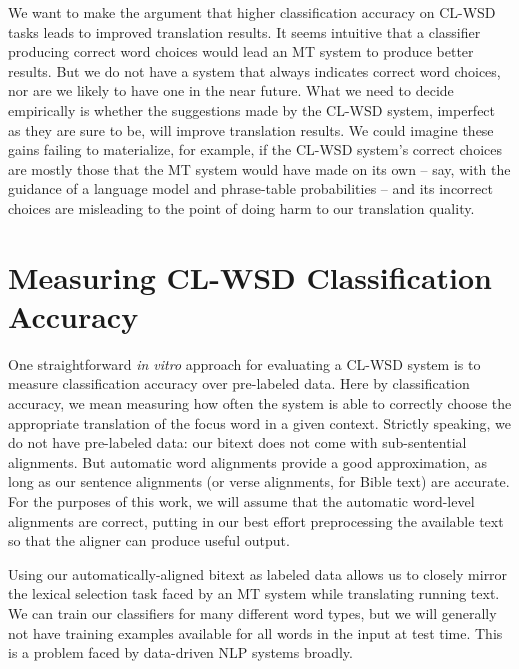 
We want to make the argument that higher classification accuracy on CL-WSD
tasks leads to improved translation results. It seems intuitive that a
classifier producing correct word choices would lead an MT system to produce
better results. But we do not have a system that always indicates correct word
choices, nor are we likely to have one in the near future. What we need to
decide empirically is whether the suggestions made by the CL-WSD system,
imperfect as they are sure to be, will improve translation results. We could
imagine these gains failing to materialize, for example, if the CL-WSD system's
correct choices are mostly those that the MT system would have made on its own
-- say, with the guidance of a language model and phrase-table probabilities --
and its incorrect choices are misleading to the point of doing harm to our
translation quality.




\section{Measuring CL-WSD Classification Accuracy}
One straightforward \emph{in vitro} approach for evaluating a CL-WSD system is
to measure classification accuracy over pre-labeled data. Here by
classification accuracy, we mean measuring how often the system is able to
correctly choose the appropriate translation of the focus word in a given
context.
Strictly speaking, we
do not have pre-labeled data: our bitext does not come with sub-sentential
alignments. But automatic word alignments provide a good approximation, as long
as our sentence alignments (or verse alignments, for Bible text) are accurate.
For the purposes of this work, we will assume that the automatic word-level
alignments are correct, putting in our best effort preprocessing the available
text so that the aligner can produce useful output.

Using our automatically-aligned bitext as labeled data allows us to closely
mirror the lexical selection task faced by an MT system while translating
running text. We can train our classifiers for many different word types, but
we will generally not have training examples available for all words in the
input at test time. This is a problem faced by data-driven NLP systems broadly.

